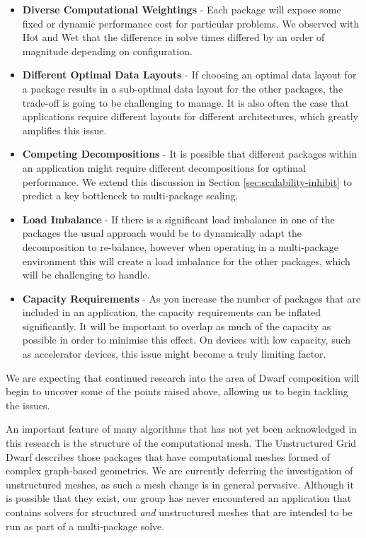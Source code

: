 \documentclass[runningheads,a4paper]{llncs}
\begin{document}
\begin{itemize}
  \item \textbf{Diverse Computational Weightings} - Each package will expose some fixed or dynamic performance cost for particular problems. We observed with Hot and Wet that the difference in solve times differed by an order of magnitude depending on configuration.
  \item \textbf{Different Optimal Data Layouts} - If choosing an optimal data layout for a package results in a sub-optimal data layout for the other packages, the trade-off is going to be challenging to manage. It is also often the case that applications require different layouts for different architectures, which greatly amplifies this issue. 
  \item \textbf{Competing Decompositions} - It is possible that different packages within an application might require different decompositions for optimal performance. We extend this discussion in Section \ref{sec:scalability-inhibit} to predict a key bottleneck to multi-package scaling.
  \item \textbf{Load Imbalance} - If there is a significant load imbalance in one of the packages the usual approach would be to dynamically adapt the decomposition to re-balance, however when operating in a multi-package environment this will create a load imbalance for the other packages, which will be challenging to handle.
  \item \textbf{Capacity Requirements} - As you increase the number of packages that are included in an application, the capacity requirements can be inflated significantly. It will be important to overlap as much of the capacity as possible in order to minimise this effect. On devices with low capacity, such as accelerator devices, this issue might become a truly limiting factor.
\end{itemize}

We are expecting that continued research into the area of Dwarf composition will begin to uncover some of the points raised above, allowing us to begin tackling the issues.

An important feature of many algorithms that has not yet been acknowledged in this research is the structure of the computational mesh. The Unstructured Grid Dwarf describes those packages that have computational meshes formed of complex graph-based geometries. We are currently deferring the investigation of unstructured meshes, as such a mesh change is in general pervasive. Although it is possible that they exist, our group has never encountered an application that contains solvers for structured \textit{and} unstructured meshes that are intended to be run as part of a multi-package solve.
\end{document}
